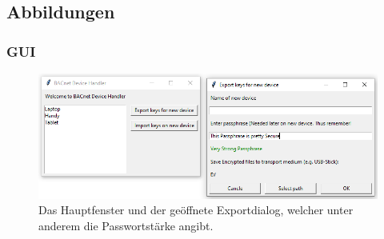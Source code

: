 \documentclass[a4paper,titlepage]{article}
\begin{document}
\newpage

	\subsection{Abbildungen}
		\subsubsection{GUI} 	\label{fig:UI}
		\begin{figure}[H] %
			\centering
			\includegraphics[width=1\textwidth]{figures/UI}
			\caption*{Das Hauptfenster und der geöffnete Exportdialog, welcher unter anderem die Passwortstärke angibt.}
		\end{figure}
		
		\subsubsection{}
		
\end{document}
